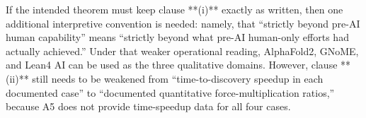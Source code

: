If the intended theorem must keep clause **(i)** exactly as written, then one additional interpretive convention is needed: namely, that “strictly beyond pre-AI human capability” means “strictly beyond what pre-AI human-only efforts had actually achieved.” Under that weaker operational reading, AlphaFold2, GNoME, and Lean4 AI can be used as the three qualitative domains. However, clause **(ii)** still needs to be weakened from “time-to-discovery speedup in each documented case” to “documented quantitative force-multiplication ratios,” because A5 does not provide time-speedup data for all four cases.